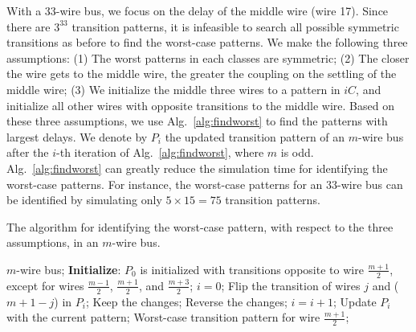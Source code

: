 \documentclass[10pt,journal]{IEEEtran}
\begin{document}
With a 33-wire bus, we focus on the delay of the middle wire (wire 17). Since there are $3^{33}$ transition patterns, it is infeasible to search all possible symmetric transitions as before to find the worst-case patterns. We make the following three assumptions: (1) The worst patterns in each classes are symmetric; (2) The closer the wire gets to the middle wire, the greater the coupling on the settling of the middle wire; (3) We initialize the middle three wires to a pattern in $iC$, and initialize all other wires with opposite transitions to the middle wire. Based on these three assumptions, we use Alg.~\ref{alg:findworst} to find the patterns with largest delays. We denote by $P_i$ the updated transition pattern of an $m$-wire bus after the $i$-th iteration of Alg.~\ref{alg:findworst}, where $m$ is odd. Alg.~\ref{alg:findworst} can greatly reduce the simulation time for identifying the worst-case patterns. For instance, the worst-case patterns for an $33$-wire bus can be identified by simulating only $5 \times 15 = 75$ transition patterns.


\begin{algorithm}[!tp]
  \caption{The algorithm for identifying the worst-case pattern, with respect to the three assumptions, in an $m$-wire bus.}
  \begin{algorithmic}
    \REQUIRE $m$-wire bus;
    \STATE \textbf{Initialize}: $P_0$ is initialized with transitions opposite to wire $\frac{m+1}{2}$, except for wires $\frac{m-1}{2}$, $\frac{m+1}{2}$, and $\frac{m+3}{2}$;
    \STATE $i=0$;
    \REPEAT
    \STATE Flip the transition of wires $j$ and ($m+1-j$) in $P_i$;
    \STATE Keep the changes;
    \ELSE
    \STATE Reverse the changes;
    \ENDIF
    \ENDFOR
    \STATE $i=i+1$;
    \STATE Update $P_{i}$ with the current pattern;
    \RETURN Worst-case transition pattern for wire $\frac{m+1}{2}$;
  \end{algorithmic}
  \label{alg:findworst}
\end{algorithm}
\end{document}
